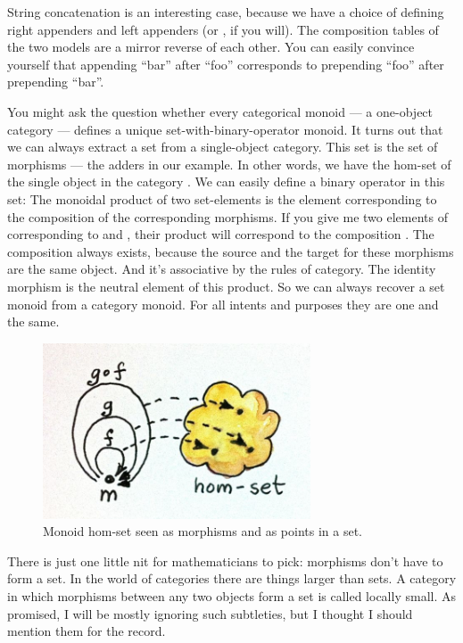 String concatenation is an interesting case, because we have a choice of
defining right appenders and left appenders (or , if
you will). The composition tables of the two models are a mirror reverse
of each other. You can easily convince yourself that appending ``bar''
after ``foo'' corresponds to prepending ``foo'' after prepending
``bar''.

You might ask the question whether every categorical monoid --- a
one-object category --- defines a unique set-with-binary-operator
monoid. It turns out that we can always extract a set from a
single-object category. This set is the set of morphisms --- the adders
in our example. In other words, we have the hom-set  of the
single object  in the category . We can easily define a binary
operator in this set: The monoidal product of two set-elements is the
element corresponding to the composition of the corresponding morphisms.
If you give me two elements of  corresponding to  and
, their product will correspond to the composition
. The composition always exists, because the source and the
target for these morphisms are the same object. And it's associative by
the rules of category. The identity morphism is the neutral element of
this product. So we can always recover a set monoid from a category
monoid. For all intents and purposes they are one and the same.

\begin{figure}
  \centering
          \includegraphics[width=3.12500in]{images/monoidhomset.jpg}
      \captionsetup{labelformat=empty,font=scriptsize}
      \caption{Monoid hom-set seen as morphisms and as points in a set.}
\end{figure}

There is just one little nit for mathematicians to pick: morphisms don't
have to form a set. In the world of categories there are things larger
than sets. A category in which morphisms between any two objects form a
set is called locally small. As promised, I will be mostly ignoring such
subtleties, but I thought I should mention them for the record.

